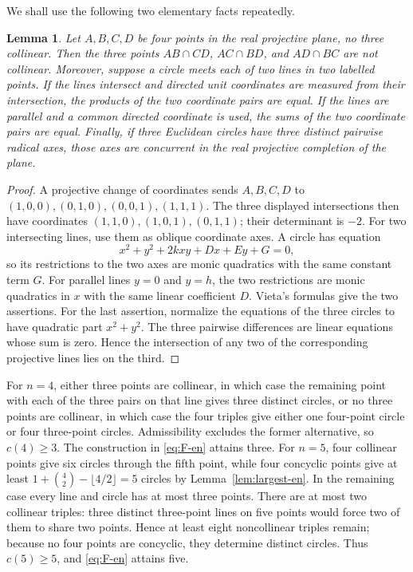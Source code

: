 \documentclass[11pt,a4paper]{article}
\newtheorem{lemma}[theorem]{Lemma}
\theoremstyle{definition}
\begin{document}
We shall use the following two elementary facts repeatedly.
\begin{lemma}\label{lem:two-line-geometry-en}
Let $A,B,C,D$ be four points in the real projective plane, no three collinear.
Then the three points $AB\cap CD$, $AC\cap BD$, and $AD\cap BC$ are not
collinear.  Moreover, suppose a circle meets each of two lines in two labelled
points.  If the lines intersect and directed unit coordinates are measured from
their intersection, the products of the two coordinate pairs are equal.  If the
lines are parallel and a common directed coordinate is used, the sums of the two
coordinate pairs are equal.  Finally, if three Euclidean circles have three
distinct pairwise radical axes, those axes are concurrent in the real projective
completion of the plane.
\end{lemma}
\begin{proof}
A projective change of coordinates sends $A,B,C,D$ to
$(1,0,0),(0,1,0),(0,0,1),(1,1,1)$.  The three displayed intersections then have
coordinates $(1,1,0),(1,0,1),(0,1,1)$; their determinant is $-2$.
For two intersecting lines, use them as oblique coordinate axes.  A circle has
equation
\[
x^2+y^2+2kxy+Dx+Ey+G=0,
\]
so its restrictions to the two axes are monic quadratics with the same constant
term $G$.  For parallel lines $y=0$ and $y=h$, the two restrictions are monic
quadratics in $x$ with the same linear coefficient $D$.  Vieta's formulas give
the two assertions.  For the last assertion, normalize the equations of the
three circles to have quadratic part $x^2+y^2$.  The three pairwise differences
are linear equations whose sum is zero.  Hence the intersection of any two of
the corresponding projective lines lies on the third.
\end{proof}

For $n=4$, either three points are collinear, in which case the remaining point
with each of the three pairs on that line gives three distinct circles, or no three
points are collinear, in which case the four triples give either one four-point
circle or four three-point circles.  Admissibility excludes the former alternative,
so $c(4)\ge3$.  The construction in \eqref{eq:F-en} attains three.  For $n=5$,
four collinear points give six circles through the fifth point, while four concyclic
points give at least $1+\binom42-\lfloor4/2\rfloor=5$ circles by
Lemma~\ref{lem:largest-en}.  In the remaining case every line and circle has at most
three points.  There are at most two collinear triples: three distinct three-point
lines on five points would force two of them to share two points.  Hence at least
eight noncollinear triples remain; because no four points are concyclic, they
determine distinct circles.  Thus $c(5)\ge5$, and \eqref{eq:F-en} attains five.
\end{document}
